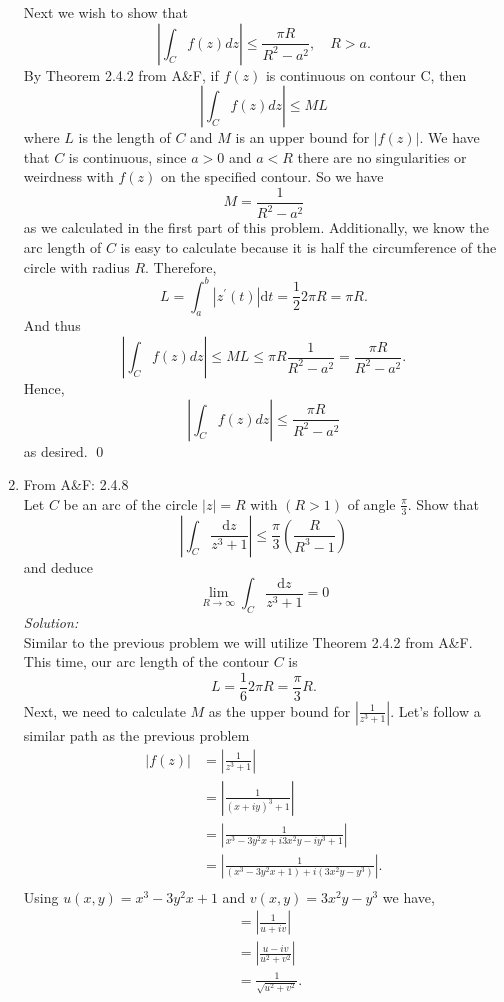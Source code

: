 \documentclass[10pt]{amsart}
\newcommand{\D}{\mathrm{d}}
\theoremstyle{nonumberplain}
\begin{document}
\begin{enumerate}[label={\bf {\arabic*}:}]
\noindent
Next we wish to show that 
$$
\left| \int_C f(z) dz \right| \leq \frac{\pi R}{R^2 - a^2}, \quad R > a.
$$
By Theorem 2.4.2 from A\&F, if $f(z)$ is continuous on contour C, then
$$
\left| \int_C f(z) dz \right| \leq ML
$$
where $L$ is the length of $C$ and $M$ is an upper bound for $\left| f(z) \right|$.
We have that $C$ is continuous, since $a >0$ and $a < R$ there are no singularities or weirdness with $f(z)$ on the specified contour.
So we have 
$$
M = \frac{1}{R^2 - a^2}
$$
as we calculated in the first part of this problem.
Additionally, we know the arc length of $C$ is easy to calculate because it is half the circumference of the circle with radius $R$. Therefore,
$$
L = \int_a^b |z^\prime(t)| \D t = \frac 1 2 2 \pi R = \pi R.
$$
And thus
$$
\left| \int_C f(z) dz \right| \leq ML \leq \pi R\frac{1}{R^2 - a^2} = \frac{\pi R}{R^2 - a^2}.
$$
Hence, 
$$
\left| \int_C f(z) dz \right| \leq \frac{\pi R}{R^2 - a^2}
$$
as desired.
\qed
\\
\item From A\&F: 2.4.8 \\
Let $C$ be an arc of the circle $\left|z\right| = R$ with $(R > 1)$ of angle $\frac{\pi}{3}$.
Show that 
$$
\left| \int_C \frac{\D z}{z^3 + 1} \right| \leq \frac \pi 3 \left( \frac{R}{R^3 - 1} \right)
$$
and deduce
$$
\lim_{R \rightarrow \infty} \int_C \frac{\D z}{z^3 + 1} = 0
$$
\textit{Solution:} \\
Similar to the previous problem we will utilize Theorem 2.4.2 from A\&F. This time, our arc length of the contour $C$ is
$$
L = \frac 1 6 2\pi R = \frac{\pi}{3} R.
$$
Next, we need to calculate $M$ as the upper bound for $\left| \frac{1}{z^3 + 1} \right|$.
Let's follow a similar path as the previous problem
\begin{align*}
\left| f(z) \right| &= \left| \frac 1 {z^3 + 1} \right| \\
	&= \left| \frac 1 {\left( x + iy \right)^3 + 1} \right| \\
	&= \left| \frac 1 {x^3 -3y^2x + i3x^2y - iy^3 + 1} \right| \\
	&= \left| \frac 1 {\left(x^3 -3y^2x + 1\right) + i\left(3x^2y - y^3\right)} \right|. \\
\end{align*}
Using $u(x, y) = x^3 -3y^2x + 1$ and $v(x, y) = 3x^2y - y^3$ we have,
\begin{align*}
	&= \left| \frac 1 {u + iv} \right| \\
	&= \left| \frac{u - iv }{u^2 + v^2 } \right| \\
	&= \frac{1}{\sqrt{u^2 + v^2}}.

\end{align*}
\end{enumerate}
\end{document}
